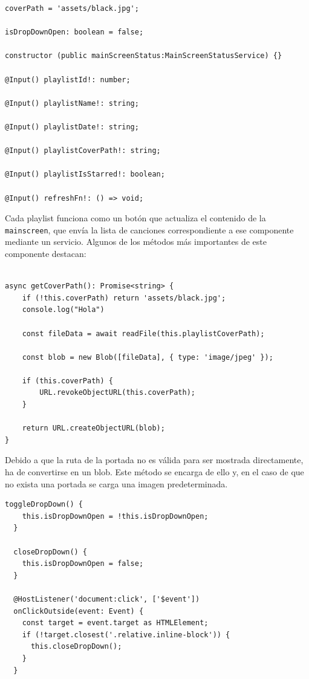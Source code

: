\documentclass[11pt, a4paper]{article}
\begin{document}
                \begin{lstlisting}[caption={Atributos y Constructora Playlist}]
coverPath = 'assets/black.jpg';

isDropDownOpen: boolean = false;

constructor (public mainScreenStatus:MainScreenStatusService) {}

@Input() playlistId!: number;

@Input() playlistName!: string;

@Input() playlistDate!: string;

@Input() playlistCoverPath!: string;

@Input() playlistIsStarred!: boolean;

@Input() refreshFn!: () => void;
                \end{lstlisting}

                Cada playlist funciona como un botón que actualiza el contenido de la \verb|mainscreen|, que envía la lista de canciones correspondiente a ese componente mediante un servicio. Algunos de los métodos más importantes de este componente destacan:

                \begin{lstlisting}[caption={getCoverPath()}]

async getCoverPath(): Promise<string> {
    if (!this.coverPath) return 'assets/black.jpg';
    console.log("Hola")

    const fileData = await readFile(this.playlistCoverPath);
        
    const blob = new Blob([fileData], { type: 'image/jpeg' });

    if (this.coverPath) {
        URL.revokeObjectURL(this.coverPath);
    }

    return URL.createObjectURL(blob);
}
                \end{lstlisting}

                Debido a que la ruta de la portada no es válida para ser mostrada directamente, ha de convertirse en un blob. Este método se encarga de ello y, en el caso de que no exista una portada se carga una imagen predeterminada.

                \begin{lstlisting}[caption={Dropdown}]
toggleDropDown() {
    this.isDropDownOpen = !this.isDropDownOpen;
  }

  closeDropDown() {
    this.isDropDownOpen = false;
  }

  @HostListener('document:click', ['$event'])
  onClickOutside(event: Event) {
    const target = event.target as HTMLElement;
    if (!target.closest('.relative.inline-block')) {
      this.closeDropDown();
    }
  }
                \end{lstlisting}
\end{document}
